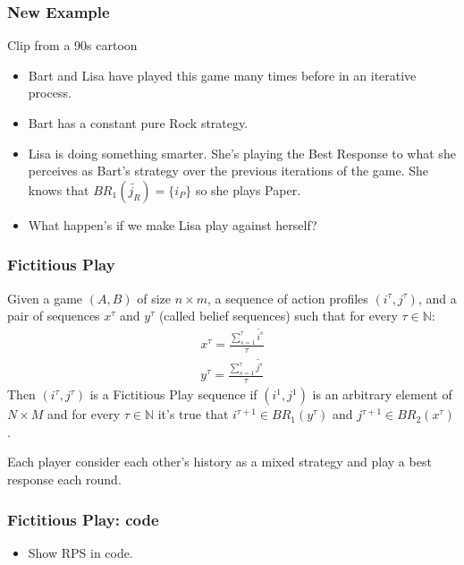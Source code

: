 \documentclass[pdf]{beamer}
\newcommand{\pstrat}{\widetilde}
\begin{document}
\begin{frame}
    \frametitle{New Example}
    Clip from a 90s cartoon
    \pause 
    \begin{itemize}
        \item \pause Bart and Lisa have played this game many times before in an iterative process.
        \item \pause Bart has a constant pure Rock strategy.
        \item \pause Lisa is doing something smarter. She's playing the Best Response to what she perceives as Bart's strategy over the previous iterations of the game. She knows that $BR_1(\pstrat{j_R}) = \{ i_P\}$ so she plays Paper. 
        \item \pause What happen's if we make Lisa play against herself?
    \end{itemize}
\end{frame}

\begin{frame}
    \frametitle{Fictitious Play}

    \begin{definition} \label{def:fp:berger}
        Given a game $(A, B)$  of size $n \times m$, a sequence of action profiles $(i^\tau, j^\tau)$, and a pair of sequences $x^\tau$ and $y^\tau$ (called belief sequences) such that for every $\tau \in \mathbb{N}$:
        \begin{gather*}
            x^\tau= \frac{\sum^\tau_{s=1} \pstrat{i^s}}{\tau}  \\
            y^\tau= \frac{\sum^\tau_{s=1} \pstrat{j^s}}{\tau}
        \end{gather*}
        Then $(i^\tau, j^\tau)$ is a Fictitious Play sequence if $(i^1, j^1)$ is an arbitrary element of $N \times M$ and for every $\tau \in \mathbb{N}$ it's true that $i^{\tau+1} \in BR_1(y^\tau)$ and $j^{\tau+1} \in BR_2(x^\tau)$.
    \end{definition}
    Each player consider each other's history as a mixed strategy and play a best response each round.
\end{frame}

\begin{frame}
    \frametitle{Fictitious Play: code}
    \begin{itemize}
        \item Show RPS in code.
    \end{itemize}    

\end{frame}
\end{document}
